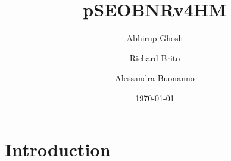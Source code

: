\documentclass[twocolumn,prd,superscriptaddress,amsfonts,amssymb,amsmath,preprintnumbers]{revtex4-1}
\begin{document}
\title{pSEOBNRv4HM}

\author{Abhirup Ghosh}
\author{Richard Brito}
\author{Alessandra Buonanno}

\date{\today}

\maketitle


\section{Introduction}\label{sec:intro}

\end{document}
